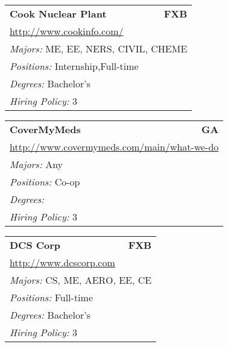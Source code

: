 \documentclass[twoside]{article}
\begin{document}
\begin{center}
\begin{multicols}{3}
\begin{FlushLeft}
\begin{minipage}{.9\columnwidth}
\end{minipage}
 
\begin{minipage}{.9\columnwidth}\begin{tabularx}{.95\columnwidth}{Xr}
                 {\Large\bf Cook Nuclear Plant} & {\Large\bf FXB}\\
    \multicolumn{2}{p{.95\columnwidth}}{\url{http://www.cookinfo.com/}}\\
    \multicolumn{2}{p{.95\columnwidth}}{\emph{Majors:} ME, EE, NERS, CIVIL, CHEME}\\
    \multicolumn{2}{p{.95\columnwidth}}{\emph{Positions:} Internship,Full-time}\\
    \multicolumn{2}{p{.95\columnwidth}}{\emph{Degrees:} Bachelor's}\\
    \multicolumn{2}{p{.95\columnwidth}}{\emph{Hiring Policy:} 3}\\
    \end{tabularx}
    
\end{minipage}
 
\begin{minipage}{.9\columnwidth}\begin{tabularx}{.95\columnwidth}{Xr}
                 {\Large\bf CoverMyMeds} & {\Large\bf GA}\\
    \multicolumn{2}{p{.95\columnwidth}}{\url{http://www.covermymeds.com/main/what-we-do}}\\
    \multicolumn{2}{p{.95\columnwidth}}{\emph{Majors:} Any}\\
    \multicolumn{2}{p{.95\columnwidth}}{\emph{Positions:} Co-op}\\
    \multicolumn{2}{p{.95\columnwidth}}{\emph{Degrees:} }\\
    \multicolumn{2}{p{.95\columnwidth}}{\emph{Hiring Policy:} 3}\\
    \end{tabularx}
    
\end{minipage}
 
\begin{minipage}{.9\columnwidth}\begin{tabularx}{.95\columnwidth}{Xr}
                 {\Large\bf DCS Corp} & {\Large\bf FXB}\\
    \multicolumn{2}{p{.95\columnwidth}}{\url{http://www.dcscorp.com}}\\
    \multicolumn{2}{p{.95\columnwidth}}{\emph{Majors:} CS, ME, AERO, EE, CE}\\
    \multicolumn{2}{p{.95\columnwidth}}{\emph{Positions:} Full-time}\\
    \multicolumn{2}{p{.95\columnwidth}}{\emph{Degrees:} Bachelor's}\\
    \multicolumn{2}{p{.95\columnwidth}}{\emph{Hiring Policy:} 3}\\
    \end{tabularx}
    

\end{minipage}
\end{FlushLeft}
\end{multicols}
\end{center}
\end{document}
